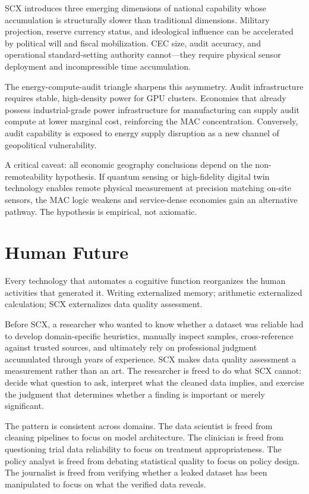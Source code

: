 \documentclass[twocolumn]{article}
\theoremstyle{definition}
\begin{document}
SCX introduces three emerging dimensions of national capability whose accumulation is structurally slower than traditional dimensions. Military projection, reserve currency status, and ideological influence can be accelerated by political will and fiscal mobilization. CEC size, audit accuracy, and operational standard-setting authority cannot---they require physical sensor deployment and incompressible time accumulation.

The energy-compute-audit triangle sharpens this asymmetry. Audit infrastructure requires stable, high-density power for GPU clusters. Economies that already possess industrial-grade power infrastructure for manufacturing can supply audit compute at lower marginal cost, reinforcing the MAC concentration. Conversely, audit capability is exposed to energy supply disruption as a new channel of geopolitical vulnerability.

A critical caveat: all economic geography conclusions depend on the non-remoteability hypothesis. If quantum sensing or high-fidelity digital twin technology enables remote physical measurement at precision matching on-site sensors, the MAC logic weakens and service-dense economies gain an alternative pathway. The hypothesis is empirical, not axiomatic.

\section{Human Future}
\label{sec:human}

Every technology that automates a cognitive function reorganizes the human activities that generated it. Writing externalized memory; arithmetic externalized calculation; SCX externalizes data quality assessment.

Before SCX, a researcher who wanted to know whether a dataset was reliable had to develop domain-specific heuristics, manually inspect samples, cross-reference against trusted sources, and ultimately rely on professional judgment accumulated through years of experience. SCX makes data quality assessment a measurement rather than an art. The researcher is freed to do what SCX cannot: decide what question to ask, interpret what the cleaned data implies, and exercise the judgment that determines whether a finding is important or merely significant.

The pattern is consistent across domains. The data scientist is freed from cleaning pipelines to focus on model architecture. The clinician is freed from questioning trial data reliability to focus on treatment appropriateness. The policy analyst is freed from debating statistical quality to focus on policy design. The journalist is freed from verifying whether a leaked dataset has been manipulated to focus on what the verified data reveals.
\end{document}
